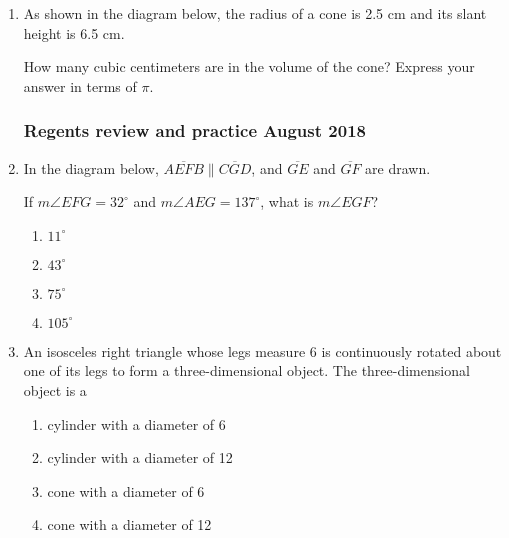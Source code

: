 \documentclass[12pt, oneside]{article}
\begin{document}
\begin{enumerate}[itemsep=0.5cm]
\newpage
\item As shown in the diagram below, the radius of a cone is 2.5 cm and its slant height is 6.5 cm.
  \begin{center}
  \end{center}
How many cubic centimeters are in the volume of the cone? Express your answer in terms of $\pi$.

\subsubsection*{Regents review and practice \hfill August 2018}
\item In the diagram below, $\overline{AEFB} \parallel \overline{CGD}$, and $\overline{GE}$ and $\overline{GF}$ are drawn.
\begin{center}
  \end{center}
If $m\angle EFG = 32^\circ$ and $m\angle AEG = 137^\circ$, what is $m\angle EGF$?
\begin{multicols}{2}
  \begin{enumerate}
    \item $11^\circ$
    \item $43^\circ$
    \item $75^\circ$
    \item $105^\circ$
  \end{enumerate}
\end{multicols}

\newpage
\item An isosceles right triangle whose legs measure 6 is continuously rotated about one of its legs to form a three-dimensional object. The three-dimensional object is a
  \begin{enumerate}
    \item cylinder with a diameter of 6
    \item cylinder with a diameter of 12
    \item cone with a diameter of 6
    \item cone with a diameter of 12
  \end{enumerate}


\end{enumerate}
\end{document}
